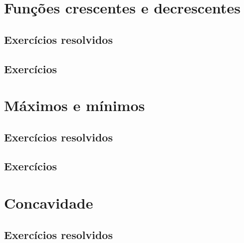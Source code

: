 \construirExer


\section{Funções crescentes e decrescentes}
\construirSec

\subsection*{Exercícios resolvidos}

\construirExeresol


\subsection*{Exercícios}

\construirExer


\section{Máximos e mínimos}
\construirSec

\subsection*{Exercícios resolvidos}

\construirExeresol


\subsection*{Exercícios}

\construirExer



\section{Concavidade}
\construirSec

\subsection*{Exercícios resolvidos}

